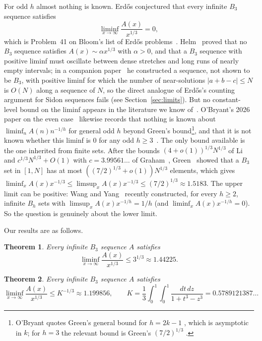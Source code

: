 \documentclass[11pt]{amsart}
\newtheorem{theorem}{Theorem}
\theoremstyle{remark}
\begin{document}
For odd $h$ almost nothing is known. Erd\H{o}s conjectured that every infinite $B_3$ sequence satisfies
\[
\liminf_{x\to\infty}\frac{A(x)}{x^{1/3}}=0,
\]
which is Problem~41 on Bloom's list of Erd\H{o}s problems~\cite{ErdosProblems}. Helm~\cite{Helm96} proved that no $B_3$ sequence satisfies $A(x)\sim\alpha x^{1/3}$ with $\alpha>0$, and that a $B_3$ sequence with positive liminf must oscillate between dense stretches and long runs of nearly empty intervals; in a companion paper~\cite{Helm96b} he constructed a sequence, not shown to be $B_3$, with positive liminf for which the number of near-solutions $|a+b-c|\le N$ is $O(N)$ along a sequence of $N$, so the direct analogue of Erd\H{o}s's counting argument for Sidon sequences fails (see Section~\ref{sec:limits}). But no constant-level bound on the liminf appears in the literature we know of~\cite{Graham,HalberstamRoth,Helm96,Helm96b,Li,OBryantI,OBryant}. O'Bryant's 2026 paper on the even case~\cite[\S5]{OBryant} likewise records that nothing is known about $\liminf_nA(n)n^{-1/h}$ for general odd $h$ beyond Green's bound\footnote{O'Bryant quotes Green's general bound for $h=2k-1$ \cite[Theorem~23]{Green}, which is asymptotic in $k$; for $h=3$ the relevant bound is Green's $(7/2)^{1/3}$ \cite[Theorem~17]{Green}.}, and that it is not known whether this liminf is $0$ for any odd $h\ge3$~\cite[\S1.2]{OBryant}.
The only bound available is the one inherited from finite sets. After the bounds $(4+o(1))^{1/3}N^{1/3}$ of Li~\cite{Li} and $c^{1/3}N^{1/3}+O(1)$ with $c=3.99561\ldots$ of Graham~\cite[Theorem~6]{Graham}, Green~\cite{Green} showed that a $B_3$ set in $[1,N]$ has at most $((7/2)^{1/3}+o(1))N^{1/3}$ elements, which gives $\liminf_x A(x)x^{-1/3}\le\limsup_x A(x)x^{-1/3}\le(7/2)^{1/3}\approx1.5183$. The upper limit can be positive: Wang and Yang~\cite{WangYang} recently constructed, for every $h\ge2$, infinite $B_h$ sets with $\limsup_xA(x)x^{-1/h}=1/h$ (and $\liminf_xA(x)x^{-1/h}=0$). So the question is genuinely about the lower limit.

Our results are as follows.

\begin{theorem}\label{thm:main1}
Every infinite $B_3$ sequence $A$ satisfies
\[
\liminf_{x\to\infty}\frac{A(x)}{x^{1/3}}\le 3^{1/3}\approx1.44225.
\]
\end{theorem}

\begin{theorem}\label{thm:main2}
Every infinite $B_3$ sequence $A$ satisfies
\[
\liminf_{x\to\infty}\frac{A(x)}{x^{1/3}}\le K^{-1/3}\approx1.199856,
\qquad
K=\frac13\int_0^1\!\!\int_0^1\frac{dt\,dz}{1+t^3-z^3}=0.5789121387\ldots
\]
\end{theorem}
\end{document}
